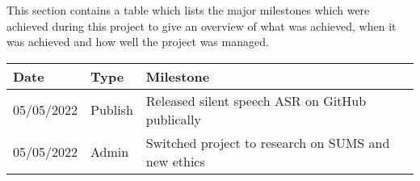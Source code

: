 This section contains a table which lists the major milestones which were
achieved during this project to give an overview of what was achieved, when it was
achieved and how well the project was managed.

{\small\begin{center}
    \begin{tabularx}{\textwidth}{ l l l }
        Date & Type & Milestone \\
        \hline
        05/05/2022 & Publish & Released silent speech ASR on GitHub publically \\
        05/05/2022 & Admin & Switched project to research on SUMS and new ethics
    \end{tabularx}
\end{center}}